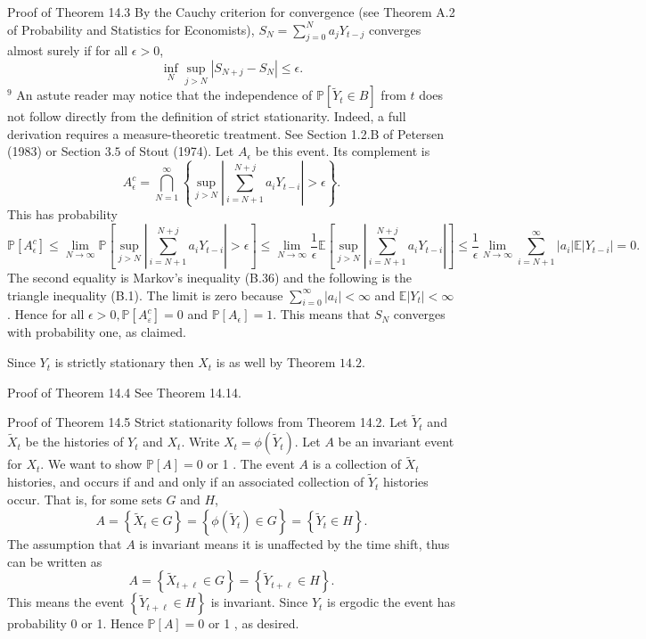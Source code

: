 \documentclass[10pt]{article}
\begin{document}
Proof of Theorem 14.3 By the Cauchy criterion for convergence (see Theorem A.2 of Probability and Statistics for Economists), $S_{N}=\sum_{j=0}^{N} a_{j} Y_{t-j}$ converges almost surely if for all $\epsilon>0$,
$$
\inf _{N} \sup _{j>N}\left|S_{N+j}-S_{N}\right| \leq \epsilon .
$$
${ }^{9}$ An astute reader may notice that the independence of $\mathbb{P}\left[\widetilde{Y}_{t} \in B\right]$ from $t$ does not follow directly from the definition of strict stationarity. Indeed, a full derivation requires a measure-theoretic treatment. See Section 1.2.B of Petersen (1983) or Section $3.5$ of Stout (1974). Let $A_{\epsilon}$ be this event. Its complement is
$$
A_{\epsilon}^{c}=\bigcap_{N=1}^{\infty}\left\{\sup _{j>N}\left|\sum_{i=N+1}^{N+j} a_{i} Y_{t-i}\right|>\epsilon\right\} .
$$
This has probability
$$
\mathbb{P}\left[A_{\epsilon}^{c}\right] \leq \lim _{N \rightarrow \infty} \mathbb{P}\left[\sup _{j>N}\left|\sum_{i=N+1}^{N+j} a_{i} Y_{t-i}\right|>\epsilon\right] \leq \lim _{N \rightarrow \infty} \frac{1}{\epsilon} \mathbb{E}\left[\sup _{j>N}\left|\sum_{i=N+1}^{N+j} a_{i} Y_{t-i}\right|\right] \leq \frac{1}{\epsilon} \lim _{N \rightarrow \infty} \sum_{i=N+1}^{\infty}\left|a_{i}\right| \mathbb{E}\left|Y_{t-i}\right|=0 .
$$
The second equality is Markov's inequality (B.36) and the following is the triangle inequality (B.1). The limit is zero because $\sum_{i=0}^{\infty}\left|a_{i}\right|<\infty$ and $\mathbb{E}\left|Y_{t}\right|<\infty$. Hence for all $\epsilon>0, \mathbb{P}\left[A_{\varepsilon}^{c}\right]=0$ and $\mathbb{P}\left[A_{\epsilon}\right]=1$. This means that $S_{N}$ converges with probability one, as claimed.

Since $Y_{t}$ is strictly stationary then $X_{t}$ is as well by Theorem $14.2$.

Proof of Theorem 14.4 See Theorem 14.14.

Proof of Theorem 14.5 Strict stationarity follows from Theorem 14.2. Let $\widetilde{Y}_{t}$ and $\widetilde{X}_{t}$ be the histories of $Y_{t}$ and $X_{t}$. Write $X_{t}=\phi\left(\widetilde{Y}_{t}\right)$. Let $A$ be an invariant event for $X_{t}$. We want to show $\mathbb{P}[A]=0$ or 1 . The event $A$ is a collection of $\widetilde{X}_{t}$ histories, and occurs if and and only if an associated collection of $\widetilde{Y}_{t}$ histories occur. That is, for some sets $G$ and $H$,
$$
A=\left\{\widetilde{X}_{t} \in G\right\}=\left\{\phi\left(\widetilde{Y}_{t}\right) \in G\right\}=\left\{\widetilde{Y}_{t} \in H\right\} .
$$
The assumption that $A$ is invariant means it is unaffected by the time shift, thus can be written as
$$
A=\left\{\widetilde{X}_{t+\ell} \in G\right\}=\left\{\widetilde{Y}_{t+\ell} \in H\right\} .
$$
This means the event $\left\{\widetilde{Y}_{t+\ell} \in H\right\}$ is invariant. Since $Y_{t}$ is ergodic the event has probability 0 or 1. Hence $\mathbb{P}[A]=0$ or 1 , as desired.
\end{document}
